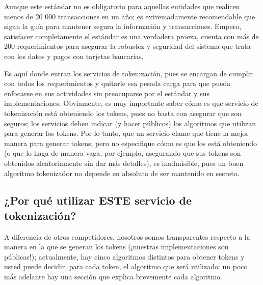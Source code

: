 Aunque este estándar no es obligatorio para aquellas entidades que
realicen menos de 20 000 transacciones en un año; es extremadamente
recomendable que sigan la guía para mantener segura la información y
transacciones.  Empero, satisfacer completamente el estándar es una
verdadera proeza, cuenta con más de 200 requerimientos para asegurar la
robustez y seguridad del sistema que trata con los datos y pagos con
tarjetas bancarias.

Es aquí donde entran los servicios de tokenización, pues se encargan de
cumplir con todos los requerimientos y quitarle esa pesada carga para
que pueda enfocarse en sus actividades sin preocuparse por el estándar y
sus implementaciones. Obviamente, es muy importante saber cómo es que
servicio de tokenización está obteniendo los tokens, pues no basta con
asegurar que son seguros; los servicios deben indicar (y hacer públicos)
los algoritmos que utilizan para generar los tokens. Por lo tanto, que
un servicio clame que tiene la mejor manera para generar tokens, pero no
especifique cómo es que los está obteniendo (o que lo haga de manera
vaga, por ejemplo, asegurando que sus tokens son obtenidos
aleatoriamente sin dar más detalles), es inadmisible, pues un buen
algoritmo tokenizador no depende en absoluto de ser mantenido en
secreto.

\subsection{¿Por qué utilizar ESTE servicio de tokenización?}

A diferencia de otros competidores, nosotros somos transparentes
respecto a la manera en la que se generan los tokens (¡nuestras
implementaciones son públicas!); actualmente, hay cinco algoritmos
distintos para obtener tokens y usted puede decidir, para cada token, el
algoritmo que será utilizado: un poco más adelante hay una sección que
explica brevemente cada algoritmo.
